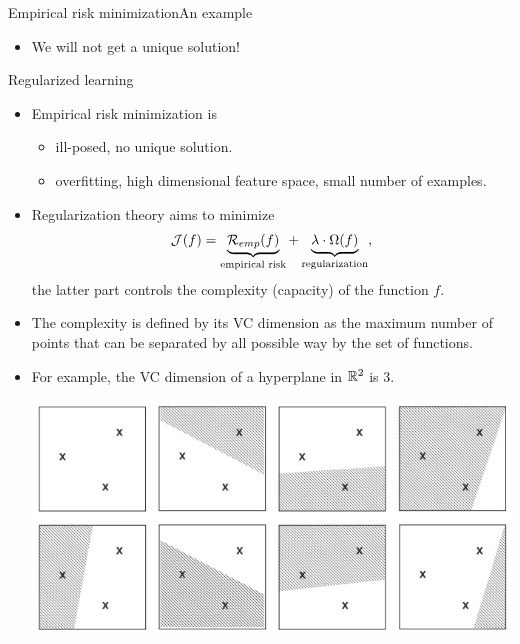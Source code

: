 \documentclass[first=dgreen,second=purple,logo=yellowexc]{aaltoslides}
\begin{document}
{\begin{frame}{Empirical risk minimization}{An example}
\begin{itemize}
\begin{center}
		\end{center}
		\item We will not get a unique solution!
	\end{itemize}
\end{frame}


\begin{frame}{Regularized learning}
	\begin{itemize}
		\item Empirical risk minimization is
		\begin{itemize}
			\footnotesize
			\item ill-posed, no unique solution.
			\item overfitting, high dimensional feature space, small number of examples.
		\end{itemize}
		\item Regularization theory \citep{Evgeniou99a,Evgeniou02regularization} aims to minimize
		\begin{align*}
			\mathcal{J}(f) = \underbrace{\mathcal{R}_{emp}(f)}_{\text{empirical risk}} + \underbrace{\lambda\cdot\Omega(f)}_{\text{regularization}},
		\end{align*}
		the latter part controls the complexity (capacity) of the function $f$.
		\item The complexity is defined by its VC dimension as the maximum number of points that can be separated by all possible way by the set of functions.
		\item For example, the VC dimension of a hyperplane in $\mathbb{R}^2$ is 3.
		\begin{center}
			\includegraphics[scale=0.2]{./figures/vc_dimension.jpg}
		\end{center}
	\end{itemize}
\end{frame}


}
\end{document}
